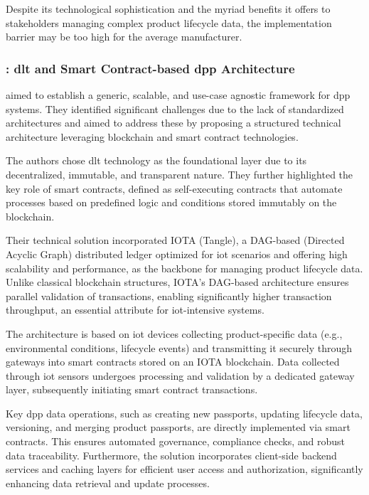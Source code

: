 Despite its technological sophistication and the myriad benefits it offers to stakeholders managing complex product lifecycle data, the implementation barrier may be too high for the average manufacturer.

\subsubsection*{\textcite{Nowacki.2023}: \ac{dlt} and Smart Contract-based \ac{dpp} Architecture}
\textcite{Nowacki.2023} aimed to establish a generic, scalable, and use-case agnostic framework for \ac{dpp} systems. They identified significant challenges due to the lack of standardized architectures and aimed to address these by proposing a structured technical architecture leveraging blockchain and smart contract technologies.

The authors chose \ac{dlt} technology as the foundational layer due to its decentralized, immutable, and transparent nature. They further highlighted the key role of smart contracts, defined as self-executing contracts that automate processes based on predefined logic and conditions stored immutably on the blockchain. \autocite{Nowacki.2023, Szabo.1997, Buterin.2014}

Their technical solution incorporated IOTA (Tangle), a DAG-based (Directed Acyclic Graph) distributed ledger optimized for \ac{iot} scenarios and offering high scalability and performance, as the backbone for managing product lifecycle data. Unlike classical blockchain structures, IOTA’s DAG-based architecture ensures parallel validation of transactions, enabling significantly higher transaction throughput, an essential attribute for \ac{iot}-intensive systems. \autocite{Popov.2018}

The architecture is based on \ac{iot} devices collecting product-specific data (e.g., environmental conditions, lifecycle events) and transmitting it securely through gateways into smart contracts stored on an IOTA blockchain. Data collected through \ac{iot} sensors undergoes processing and validation by a dedicated gateway layer, subsequently initiating smart contract transactions. \autocite{Nowacki.2023}

Key \ac{dpp} data operations, such as creating new passports, updating lifecycle data, versioning, and merging product passports, are directly implemented via smart contracts. This ensures automated governance, compliance checks, and robust data traceability. Furthermore, the solution incorporates client-side backend services and caching layers for efficient user access and authorization, significantly enhancing data retrieval and update processes. \autocite{Nowacki.2023}

